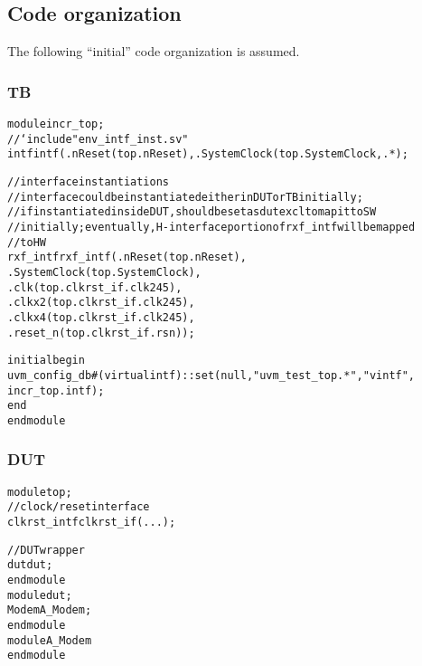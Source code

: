 \documentclass{note}
\begin{document}
\w \textcolor{red2}{}
\w \textcolor{red2}{}
\w \textcolor{red2}{}
\w \textcolor{red2}{}
\w \textcolor{red2}{}
\w \textcolor{red2}{}
\w \textcolor{red2}{}
\w \textcolor{red2}{}
\w \textcolor{red2}{}
\w \textcolor{red2}{}
\w \textcolor{red2}{}
\eit
\eit


\subsection{Code organization}
The following ``initial'' code organization is assumed.
\subsubsection{TB}
\begin{alltt}
  module incr_top;
    //`include "env_intf_inst.sv"
    intf intf(.nReset(top.nReset), .SystemClock(top.SystemClock, .*);

    // interface instantiations
    // interface could be instantiated either in DUT or TB initially;
    // if instantiated inside DUT, should be set as dutexcl to map it to SW
    // initially; eventually, H-interface portion of rxf_intf will be mapped 
    // to HW 
    rxf_intf rxf_intf(.nReset(top.nReset),
                      .SystemClock(top.SystemClock),
                      .clk(top.clkrst_if.clk245),
                      .clkx2(top.clkrst_if.clk245),
                      .clkx4(top.clkrst_if.clk245),
                      .reset_n(top.clkrst_if.rsn));
    
    initial begin
      uvm_config_db#(virtual intf)::set(null, "uvm_test_top.*", "vintf", 
                                        incr_top.intf);
    end
  endmodule

\end{alltt}

\subsubsection{DUT}
\begin{alltt}
  module top;
    // clock/reset interface
    clkrst_intf clkrst_if(...);

    // DUT wrapper
    dut dut;
  endmodule
  module dut;
    Modem A_Modem;
  endmodule
  module A_Modem
  endmodule
\end{alltt}
\end{document}
